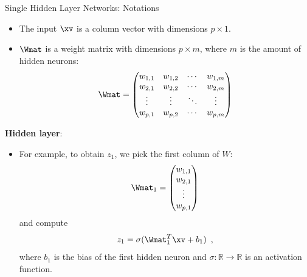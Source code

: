 \documentclass[11pt,compress,t,notes=noshow, xcolor=table]{beamer}
\begin{document}
\begin{vbframe}{Single Hidden Layer Networks: Notations}

\begin{itemize}
\item The input $\xv$ is a column vector with dimensions $p \times 1$. 
\item $\Wmat$ is a weight matrix with dimensions $p \times m$, where $m$ is the amount of hidden neurons:
$$\Wmat =
     \begin{pmatrix}
      w_{1,1} & w_{1,2} & \cdots & w_{1,m} \\
      w_{2,1} & w_{2,2} & \cdots & w_{2,m} \\
      \vdots  & \vdots  & \ddots & \vdots  \\
      w_{p,1} & w_{p,2} & \cdots & w_{p,m}
     \end{pmatrix}$$
     \end{itemize}
     \framebreak
     \textbf{Hidden layer}:
     \begin{itemize}
\item For example, to obtain $z_1$, we pick the first column of $W$:
    $$\Wmat_1 =
     \begin{pmatrix}
      w_{1,1} \\
      w_{2,1} \\
      \vdots  \\
      w_{p,1}
     \end{pmatrix}$$
and compute 
$$z_1 = \sigma(\Wmat_1^T \xv + b_1)\enspace,$$
 where $b_1$ is the bias of the first hidden neuron and $\sigma: \mathbb{R} \to \mathbb{R}$ is an activation function. 
\end{itemize}
\end{vbframe}
\end{document}
